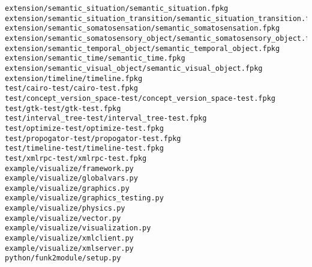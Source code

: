 \begin{lstlisting}
extension/semantic_situation/semantic_situation.fpkg
extension/semantic_situation_transition/semantic_situation_transition.fpkg
extension/semantic_somatosensation/semantic_somatosensation.fpkg
extension/semantic_somatosensory_object/semantic_somatosensory_object.fpkg
extension/semantic_temporal_object/semantic_temporal_object.fpkg
extension/semantic_time/semantic_time.fpkg
extension/semantic_visual_object/semantic_visual_object.fpkg
extension/timeline/timeline.fpkg
test/cairo-test/cairo-test.fpkg
test/concept_version_space-test/concept_version_space-test.fpkg
test/gtk-test/gtk-test.fpkg
test/interval_tree-test/interval_tree-test.fpkg
test/optimize-test/optimize-test.fpkg
test/propogator-test/propogator-test.fpkg
test/timeline-test/timeline-test.fpkg
test/xmlrpc-test/xmlrpc-test.fpkg
example/visualize/framework.py
example/visualize/globalvars.py
example/visualize/graphics.py
example/visualize/graphics_testing.py
example/visualize/physics.py
example/visualize/vector.py
example/visualize/visualization.py
example/visualize/xmlclient.py
example/visualize/xmlserver.py
python/funk2module/setup.py
\end{lstlisting}
